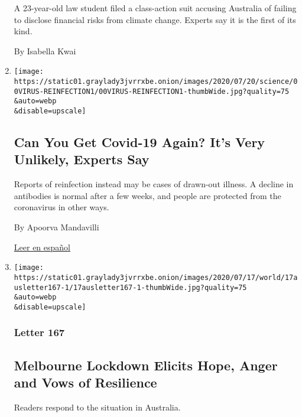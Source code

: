 \begin{enumerate}
  A 23-year-old law student filed a class-action suit accusing Australia
  of failing to disclose financial risks from climate change. Experts
  say it is the first of its kind.

  By Isabella Kwai
\item
  \href{/2020/07/22/health/covid-antibodies-herd-immunity.html}{}

  \texttt{[image: https://static01.graylady3jvrrxbe.onion/images/2020/07/20/science/00VIRUS-REINFECTION1/00VIRUS-REINFECTION1-thumbWide.jpg?quality=75\\\&auto=webp\\\&disable=upscale]}

  \hypertarget{can-you-get-covid-19-again-its-very-unlikely-experts-say}{%
  \subsection{Can You Get Covid-19 Again? It's Very Unlikely, Experts
  Say}\label{can-you-get-covid-19-again-its-very-unlikely-experts-say}}

  Reports of reinfection instead may be cases of drawn-out illness. A
  decline in antibodies is normal after a few weeks, and people are
  protected from the coronavirus in other ways.

  By Apoorva Mandavilli

  \href{https://www.nytimes3xbfgragh.onion/es/2020/07/24/espanol/ciencia-y-tecnologia/reinfeccion-coronavirus.html}{Leer
  en español}
\item
  \href{/2020/07/17/world/australia/melbourne-lockdown-readers.html}{}

  \texttt{[image: https://static01.graylady3jvrrxbe.onion/images/2020/07/17/world/17ausletter167-1/17ausletter167-1-thumbWide.jpg?quality=75\\\&auto=webp\\\&disable=upscale]}

  \hypertarget{letter-167}{%
  \subsubsection{Letter 167}\label{letter-167}}

  \hypertarget{melbourne-lockdown-elicits-hope-anger-and-vows-of-resilience}{%
  \subsection{Melbourne Lockdown Elicits Hope, Anger and Vows of
  Resilience}\label{melbourne-lockdown-elicits-hope-anger-and-vows-of-resilience}}

  Readers respond to the situation in Australia.


\end{enumerate}
